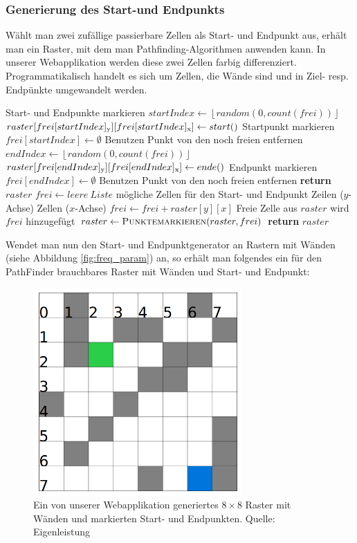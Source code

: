 \documentclass[12pt,a4paper,german]{report}
\newcommand{\floor}[1]{\left\lfloor #1 \right\rfloor}
\begin{document}
\subsubsection{Generierung des Start-und Endpunkts}
Wählt man zwei zufällige passierbare Zellen als Start- und Endpunkt aus, erhält man ein Raster, mit dem man Pathfinding-Algorithmen anwenden kann. In unserer Webapplikation werden diese zwei Zellen farbig differenziert. Programmatikalisch handelt es sich um Zellen, die Wände sind und in Ziel- resp. Endpünkte umgewandelt werden.
\begin{algorithmic}[1]
   \Comment Start- und Endpunkte markieren
  \State $startIndex \gets \floor{random(0, count(frei))}$
  \State $raster[frei[startIndex]\textsubscript{y}][frei[startIndex]\textsubscript{x}] \gets start()$ \Comment Startpunkt markieren
  \State $frei[startIndex] \gets \emptyset$ \Comment Benutzen Punkt von den noch freien entfernen
  \State $endIndex \gets \floor{random(0, count(frei))}$
  \State $raster[frei[endIndex]\textsubscript{y}][frei[endIndex]\textsubscript{x}] \gets ende()$ \Comment Endpunkt markieren
  \State $frei[endIndex] \gets \emptyset$ \Comment Benutzen Punkt von den noch freien entfernen
  \State \textbf{return} $raster$
  \EndProcedure
  \State $frei \gets leere\ Liste$ \Comment mögliche Zellen für den Start- und Endpunkt
   \Comment Zeilen ($y$-Achse)
     \Comment Zellen ($x$-Achse)
        \State $frei \gets frei + raster[y][x]$ \Comment Freie Zelle aus $raster$ wird $frei$ hinzugefügt
      \EndIf
    \EndFor
  \EndFor
  \State $raster \gets \textsc{Punktemarkieren}(raster, frei)$
  \State \textbf{return} $raster$
  \EndProcedure
\end{algorithmic}
Wendet man nun den Start- und Endpunktgenerator an Rastern mit Wänden (siehe Abbildung \ref{fig:freq_param}) an, so erhält man folgendes ein für den PathFinder brauchbares Raster mit Wänden und Start- und Endpunkt:
\begin{figure}[H]
  \centering
  \includegraphics[width=8cm]{grid2}
  \caption[Ein von unserer Webapplikation generiertes $8\times8$ Raster mit Wänden und markierten Start- und Endpunkten.]{Ein von unserer Webapplikation generiertes $8\times8$ Raster mit Wänden und markierten Start- und Endpunkten. Quelle: Eigenleistung}
  \label{fig:grid2}
\end{figure}
\end{document}
